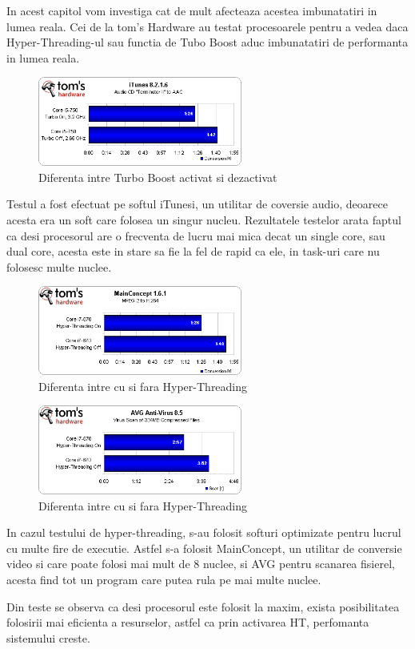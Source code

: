 In acest capitol vom investiga cat de mult afecteaza acestea imbunatatiri in lumea reala. Cei de la
tom's Hardware au testat procesoarele pentru a vedea daca Hyper-Threading-ul  sau functia de Tubo
Boost aduc imbunatatiri de performanta in lumea reala.


\begin{figure}[ht] \centering
\includegraphics[width=0.6\textwidth]{img/turbo.png}
\caption{Diferenta intre Turbo Boost activat si dezactivat \cite{turbo}} \end{figure}

Testul a fost efectuat pe softul iTunesi, un utilitar de coversie audio, deoarece acesta era un soft care folosea un singur nucleu.
Rezultatele testelor arata faptul ca desi procesorul are o frecventa de lucru mai mica decat un
single core, sau dual core, acesta este in stare sa fie la fel de rapid ca ele, in task-uri care nu
folosesc multe nuclee.

\begin{figure}[ht] \centering
\includegraphics[width=0.6\textwidth]{img/ht1.png}
\caption{Diferenta intre cu si fara Hyper-Threading \cite{ht}} \end{figure}


\begin{figure}[ht] \centering
\includegraphics[width=0.6\textwidth]{img/ht2.png}
\caption{Diferenta intre cu si fara Hyper-Threading \cite{ht}} \end{figure}

In cazul testului de hyper-threading, s-au folosit softuri optimizate pentru lucrul cu multe fire
de executie. Astfel s-a folosit MainConcept, un utilitar de conversie video si care poate folosi
mai mult de 8 nuclee, si AVG pentru scanarea fisierel, acesta find tot un program care putea rula
pe mai multe nuclee.

Din teste se observa ca desi procesorul este folosit la maxim, exista posibilitatea folosirii mai
eficienta a resurselor, astfel ca prin activarea HT, perfomanta sistemului creste.



